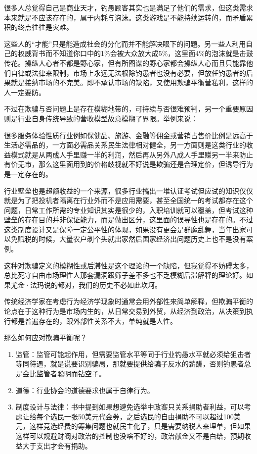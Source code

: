 \documentclass[
]{book}
\begin{document}
很多人总觉得自己是商业天才，钓愚顾客其实也是满足了他们的需求，但这类需求本来就是不应该存在的，属于内耗与泡沫。这类游戏是不能持续运转的，而矛盾累积的终点往往是灾难。

这些人的``才能''只是能造成社会的分化而并不能解决眼下的问题。另一些人利用自己的权威背书而不知道你口中的1\%会被大众放大成5\%，这里面4\%的泡沫就是击鼓传花。操纵人心者不都是野心家，但有所图谋的野心家都会操纵人心而且只能靠他们自律或法律来限制，市场上永远无法根除钓愚者也没有必要，但放任钓愚者的后果就是接纳市场的不完美。即不承认市场的缺陷，又使用欺骗平衡营私利，这样的人一定要防。

不过在欺骗与否问题上是存在模糊地带的，可持续与否很难预判，另一个重要原因则是行业自身传统导致的营收模型故意模糊了界限。举例来说：

很多服务体验性质行业例如保健品、旅游、金融等佣金或营销占售价比例是远高于生活必需品的，一方面必需品关系民生法律相对健全，另一方面则是这类行业的收益模式就是从两成人手里赚一半的利润，然后再从另外八成人手里赚另一半来防止有价无市，那么这里面用到的价格歧视就不好说是欺骗还是合理定价，但诱导行为是一定存在的。

行业壁垒也是超额收益的一个来源，很多行业搞出一堆认证考试但应试的知识仅仅就是为了把投机者隔离在行业外而不是应用需要，甚至全国统一的考试都存在这个问题，日常工作所需的专业知识其实是很少的，入职培训就可以覆盖，但考试这种壁垒的存在目的并非保证能力，而是做出区分，这里面的误导性也是存在的。不过这类制度设计又是保障一定公平性的体现，如果没有更会是群魔乱舞，当年出家可以免赋税的时候，大量农户剃个头就出家然后国家经济出问题历史上也不是没有案例。

这种对欺骗定义的模糊性或后滞性是这个理论的一个缺陷，但我觉得不妨碍太多，总比死守自由市场理性人那套漏洞跟筛子差不多也不乏模糊后滞解释的理论好。如果尤金·法玛说的都对，我们的历史不必如此坎坷。

传统经济学家在考虑行为经济学现象时通常会用外部性来简单解释，但欺骗平衡的论点在于这种行为是市场内生的，从日常交易到外贸，从经济到政治，从决策到执行都是普遍存在的，跟外部性关系不大，单纯就是人性。

那么如何应对欺骗平衡呢？

\begin{enumerate}
\def\labelenumi{\arabic{enumi}.}
\item
  监管：监管可能起作用，但需要监管水平等同于行业钓愚水平就必须给狙击者等同待遇，就是说要识别骗局，那就要提供给骗子反水的薪酬，否则钓愚者总是会比监管者聪明而钻空子。
\item
  道德：行业协会的道德要求也属于自律行为。
\item
  制度设计与法律：书中提到如果想避免选举中政客只关系捐助者利益，可以考虑让给每个选民一张50美元代金券，之后选民的自由捐助不可以超过100美元，这样竞选经费的筹集问题也就民主化了，只是需要纳税人来埋单，但如果这样可以规避财阀对政治的控制也没啥不好的，政治献金又不是白给，预期收益大于支出才会有捐助。
\end{enumerate}
\end{document}
